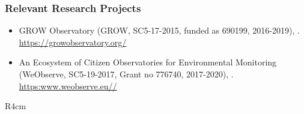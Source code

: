 \documentclass[a4paper,11pt]{article}
\begin{document}
\subsubsection*{Relevant Research Projects}

\begin{itemize}

\item GROW Observatory (GROW, SC5-17-2015, funded as 690199, 2016-2019), . \url{https://growobservatory.org/}


\item An Ecosystem of Citizen Observatories for Environmental Monitoring (WeObserve, SC5-19-2017, Grant no 776740, 2017-2020), . \url{https:www.weobserve.eu//}

\end{itemize}


\begin{wrapfigure}{R}{4cm}
\vspace{-2cm}
\hfill {}
\vspace{-1cm}
\end{wrapfigure}

\ 
\end{document}
